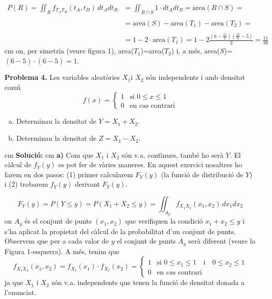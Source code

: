 \documentclass{article}
\begin{document}
\[
\begin{array}{rl}
P(R)=\iint_R f_{T_A T_B} (t_A, t_B) \, dt_A dt_B & = \iint_{R \cap S} 1 \cdot dt_A dt_B =
\text{area}(R \cap S)= \\ \\
&= \text{area}(S)-\text{area}(T_1)-\text{area}(T_2)=\\ \\
&= 1-2\cdot \text{area}(T_1)=
1-2 \frac{(6-\frac{31}{6}) (\frac{35}{6}-5)}{2}=\frac{11}{36}
\end{array}
\]
 cm
\noindent
on, per simetria (veure figura 1), area($T_1$)=area($T_2$) i, a m\'es, area($S$)=$(6-5)\cdot(6-5)=1$.


\newpage
\noindent
\textbf{Problema 4.} Les variables aleat\`ories $X_1 \mbox{i } X_2$ s\'on independents
i amb densitat com\'u 
\[
f(x) = \begin{cases}1 & \text{si } 0 \leq x \leq 1 \\ 
0 & \text{en cas contrari} \end{cases}
\]
\begin{enumerate}[a)]
\item Determinau la densitat de $Y = X_1 + X_2.$
\item Determinau la densitat de $Z = X_1 - X_2.$
\end{enumerate}

 cm
\noindent
\textbf{Soluci\'o:}
 cm
\noindent
\textbf{a)} Com que $X_1$ i $X_2$ s\'on v.a. cont\'\i nues, tamb\'e ho ser\`a $Y$.
El c\`alcul de $f_Y(y)$ es pot fer de v\`aries maneres. En aquest exercici nosaltres 
ho farem en dos pasos: (1) primer calcularem $F_Y(y)$ (la funci\'o de distribuci\'o de $Y$)
i (2) trobarem $f_Y(y)$ derivant $F_Y(y)$.

\[
F_Y(y)=P(Y \leq y)=P(X_1+X_2 \leq y)=\iint_{A_y} f_{X_1 X_2}(x_1, x_2) \, dx_1 dx_2
\]
\noindent
on $A_y$ \'es el conjunt de punts $(x_1, x_2)$ que verifiquen la condici\'o $x_1+x_2 \leq y$
i s'ha aplicat la propietat del c\`alcul de la probabilitat d'un conjunt de punts.
Observem que per a cada valor de $y$ el conjunt de punts $A_y$ ser\`a diferent (veure la
Figura 1-esquerra). A m\'es, tenim que 
\[
f_{X_1 X_2}(x_1, x_2) = f_{X_1}(x_1) \cdot f_{X_2}(x_2) = 
\begin{cases} 1 & \text{si } 0 \leq x_1 \leq 1 \quad \text{i} \quad 0 \leq x_2 \leq 1 \\
0 & \text{en cas contrari} \end{cases}
\]
\noindent
ja que $X_1$ i $X_2$ s\'on v.a. independents que tenen la funci\'o de densitat donada a
l'enunciat.
\end{document}
